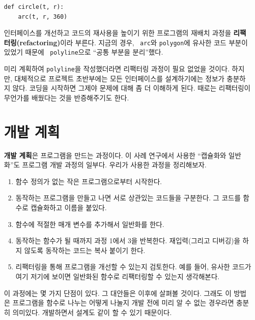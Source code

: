 \documentclass[10pt]{book}
\begin{document}
\begin{verbatim}
def circle(t, r):
    arc(t, r, 360)
\end{verbatim}
%
인터페이스를 개선하고 코드의 재사용을 높이기 위한 프로그램의 재배치
과정을 {\bf 리팩터링(refactoring)}이라 부른다.  지금의 경우, {\tt
  arc}와 {\tt polygon}에 유사한 코드 부분이 있었기 때문에 {\tt
  polyline}으로 ``공통 부분을 분리''했다.

미리 계획하여 {\tt polyline}을 작성했더라면 리팩터링 과정이 필요 없었을
것이다.  하지만, 대체적으로 프로젝트 초반부에는 모든 인터페이스를
설계하기에는 정보가 충분하지 않다.  코딩을 시작하면 그제야 문제에 대해
좀 더 이해하게 된다.  때로는 리팩터링이 무언가를 배웠다는 것을
반증해주기도 한다.


\section{개발 계획}

{\bf 개발 계획}은 프로그램을 만드는 과정이다.  이 사례 연구에서 사용한
``캡슐화와 일반화''도 프로그램 개발 과정의 일부다.  우리가 사용한
과정을 정리해보자.

\begin{enumerate}

\item 함수 정의가 없는 작은 프로그램으로부터 시작한다.

\item 동작하는 프로그램을 만들고 나면 서로 상관있는 코드들을 구분한다.
  그 코드를 함수로 캡슐화하고 이름을 붙있다.

\item 함수에 적절한 매개 변수를 추가해서 일반화를 한다. 

\item 동작하는 함수가 될 때까지 과정 1에서 3을 반복한다.  재입력(그리고
  디버깅)을 하지 않도록 동작하는 코드는 복사 붙이기 한다.

\item 리팩터링을 통해 프로그램을 개선할 수 있는지 검토한다.  예를
  들어, 유사한 코드가 여기 저기에 보이면 일반화된 함수로 리팩터링할 수
  있는지 생각해본다.

\end{enumerate}

이 과정에는 몇 가지 단점이 있다. 그 대안들은 이후에 살펴볼 것이다.
그래도 이 방법은 프로그램을 함수로 나누는 어떻게 나눌지 개발 전에 미리
알 수 없는 경우라면 충분히 의미있다.  개발하면서 설계도 같이 할 수 있기
때문이다.
\end{document}
